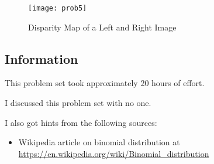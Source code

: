 \documentclass{article}
\newcommand{\info}{\clearpage \subsection*{Information}}
\begin{document}
\begin{figure*}[!h]
	\centering
	\texttt{[image: prob5]}
	\caption{Disparity Map of a Left and Right Image}
	\label{fig:p5}
\end{figure*}

\info

This problem set took approximately 20 hours of effort.

I discussed this problem set with no one.

I also got hints from the following sources:
\begin{itemize}
\item Wikipedia article on binomial distribution at \url{https://en.wikipedia.org/wiki/Binomial_distribution}
\end{itemize}
\end{document}
